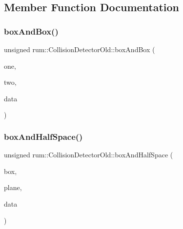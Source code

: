\subsection{Member Function Documentation}
\mbox{\label{classrum_1_1_collision_detector_old_ae97d166405110949929135e51d858150}} 
\subsubsection{\texorpdfstring{box\+And\+Box()}{boxAndBox()}}
{\footnotesize\ttfamily unsigned rum\+::\+Collision\+Detector\+Old\+::box\+And\+Box (\begin{DoxyParamCaption}\item[{const \mbox{\hyperlink{classrum_1_1_collision_box}{Collision\+Box}} \&}]{one,  }\item[{const \mbox{\hyperlink{classrum_1_1_collision_box}{Collision\+Box}} \&}]{two,  }\item[{\mbox{\hyperlink{classrum_1_1_collision_data}{Collision\+Data}} $\ast$}]{data }\end{DoxyParamCaption})\hspace{0.3cm}{\ttfamily [static]}}

\mbox{\label{classrum_1_1_collision_detector_old_a3071b8810cea5baece95f9d3f90e0a0a}} 
\subsubsection{\texorpdfstring{box\+And\+Half\+Space()}{boxAndHalfSpace()}}
{\footnotesize\ttfamily unsigned rum\+::\+Collision\+Detector\+Old\+::box\+And\+Half\+Space (\begin{DoxyParamCaption}\item[{const \mbox{\hyperlink{classrum_1_1_collision_box}{Collision\+Box}} \&}]{box,  }\item[{const \mbox{\hyperlink{classrum_1_1_collision_plane}{Collision\+Plane}} \&}]{plane,  }\item[{\mbox{\hyperlink{classrum_1_1_collision_data}{Collision\+Data}} $\ast$}]{data }\end{DoxyParamCaption})\hspace{0.3cm}{\ttfamily [static]}}

